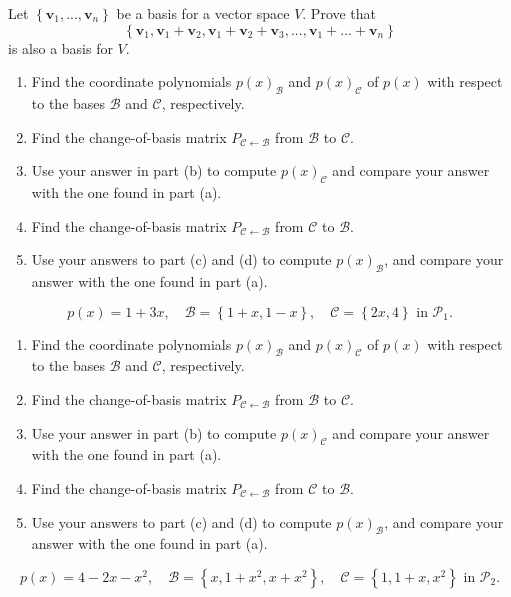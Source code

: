 \documentclass[11pt,letterpaper,boxed]{hmcpset}
\newcommand{\crb}[1]{\left\{ #1 \right\}}
\newcommand{\VEC}[1]{\ensuremath{\mathbf{#1}}\xspace}
\begin{document}
\begin{solution}
\vfill
\end{solution}
\newpage

\begin{problem}[Poole 6.2 \#58]
Let $\crb{\VEC{v}_1,..., \VEC{v}_n}$ be a basis for a vector space $V$. Prove that
\[
	\crb{\VEC{v}_1,\VEC{v}_1+\VEC{v}_2,\VEC{v}_1+\VEC{v}_2+\VEC{v}_3,...,\VEC{v}_1+...+\VEC{v}_n}
\]
is also a basis for $V$.
\end{problem}

\begin{solution}
\vfill
\end{solution}
\newpage

\begin{problem}[Poole 6.3 \#6]
\begin{enumerate}
\item Find the coordinate polynomials $p(x)_{\mathcal{B}}$ and $p(x)_{\mathcal{C}}$ of $p(x)$ with respect
to the bases $\mathcal{B}$ and $\mathcal{C}$, respectively.
\item Find the change-of-basis matrix $P_{\mathcal{C}\leftarrow\mathcal{B}}$ from $\mathcal{B}$ to $\mathcal{C}$.
\item Use your answer in part (b) to compute $p(x)_{\mathcal{C}}$ and compare your answer with the one found in part (a).
\item Find the change-of-basis matrix $P_{\mathcal{C}\leftarrow\mathcal{B}}$ from $\mathcal{C}$ to $\mathcal{B}$.
\item Use your answers to part (c) and (d) to compute $p(x)_{\mathcal{B}}$, and compare your answer with the one found in part (a).
\end{enumerate}
\[
	p(x) = 1 + 3x, \quad \mathcal{B} = \crb{1+x,1-x}, \quad \mathcal{C} = \crb{2x,4} \text{ in } \mathcal{P}_1.
\]
\end{problem}

\begin{solution}
\vfill
\end{solution}
\newpage

\begin{problem}[Poole 6.3 \#8]
\begin{enumerate}
\item Find the coordinate polynomials $p(x)_{\mathcal{B}}$ and $p(x)_{\mathcal{C}}$ of $p(x)$ with respect
to the bases $\mathcal{B}$ and $\mathcal{C}$, respectively.
\item Find the change-of-basis matrix $P_{\mathcal{C}\leftarrow\mathcal{B}}$ from $\mathcal{B}$ to $\mathcal{C}$.
\item Use your answer in part (b) to compute $p(x)_{\mathcal{C}}$ and compare your answer with the one found in part (a).
\item Find the change-of-basis matrix $P_{\mathcal{C}\leftarrow\mathcal{B}}$ from $\mathcal{C}$ to $\mathcal{B}$.
\item Use your answers to part (c) and (d) to compute $p(x)_{\mathcal{B}}$, and compare your answer with the one found in part (a).
\end{enumerate}
\[
	p(x) = 4-2x-x^2, \quad \mathcal{B} = \crb{x,1+x^2,x+x^2}, \quad \mathcal{C} = \crb{1, 1+x,x^2} \text{ in } \mathcal{P}_2.
\]
\end{problem}

\begin{solution}
\vfill
\end{solution}
\end{document}
